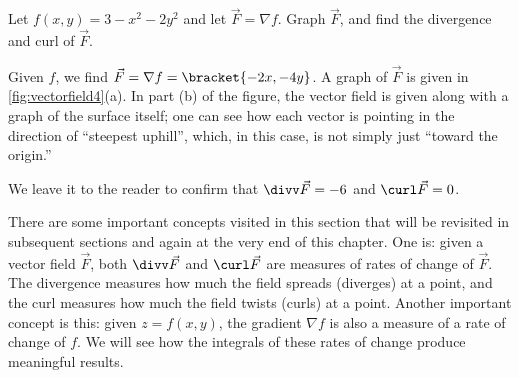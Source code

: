 
{Let $f(x,y) = 3-x^2-2y^2$ and let $\vec F = \nabla f$. Graph $\vec F$, and find the divergence and curl of $\vec F$. 
}
{Given $f$, we find $\vec F = \nabla f =\bracket{-2x,-4y}$. A graph of $\vec F$ is given in \autoref{fig:vectorfield4}(a). In part (b) of the figure, the vector field is given along with a graph of the surface itself; one can see how each vector is pointing in the direction of ``steepest uphill'', which, in this case, is not simply just ``toward the origin.''

We leave it to the reader to confirm that $\divv \vec F = -6$ and $\curl \vec F = 0$.}

There are some important concepts visited in this section that will be revisited in subsequent sections and again at the very end of this chapter. One is: given a vector field $\vec F$, both $\divv\vec F$ and $\curl\vec F$ are measures of rates of change of $\vec F$. The divergence measures how much the field spreads (diverges) at a point, and the curl measures how much the field twists (curls) at a point. Another important concept is this: given $z=f(x,y)$, the gradient $\nabla f$ is also a measure of a rate of change of $f$. We will see how the integrals of these rates of change produce meaningful results.

